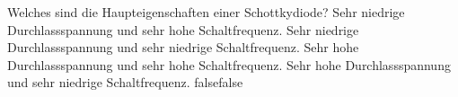    {Welches sind die Haupteigenschaften einer Schottkydiode?}
    {Sehr niedrige Durchlassspannung und sehr hohe Schaltfrequenz.}
    {Sehr niedrige Durchlassspannung und sehr niedrige Schaltfrequenz.}
    {Sehr hohe Durchlassspannung und sehr hohe Schaltfrequenz.}
    {Sehr hohe Durchlassspannung und sehr niedrige Schaltfrequenz.}
    {false}{false}